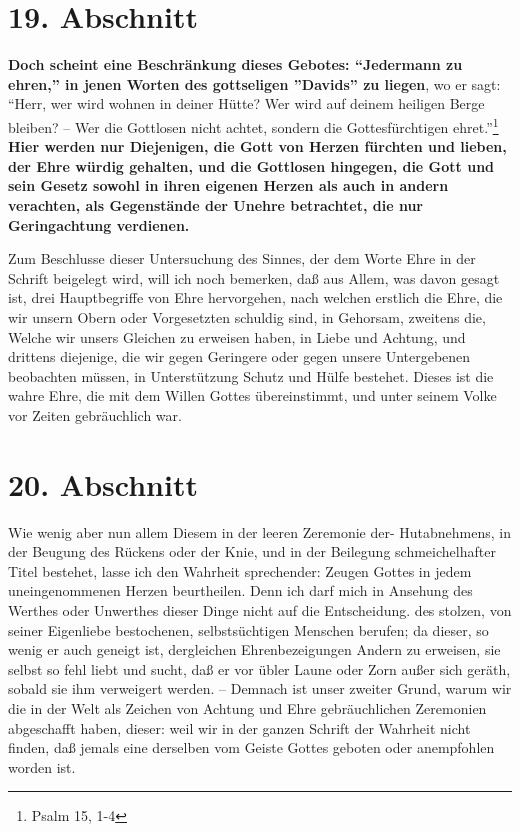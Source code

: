 \section{19. Abschnitt} \label{kap9_ab19}

\textbf{Doch scheint eine Beschränkung dieses Gebotes: "`Jedermann zu ehren,"' in jenen
Worten des gottseligen ''Davids'' zu liegen}, wo er sagt: "`Herr, wer wird wohnen
in deiner Hütte? Wer wird auf deinem heiligen Berge bleiben? -- Wer die
Gottlosen nicht achtet, sondern die Gottesfürchtigen ehret."'\footnote{Psalm 15,
1-4} \textbf{Hier werden nur Diejenigen, die Gott von Herzen fürchten und lieben, der
Ehre würdig gehalten, und die Gottlosen hingegen, die Gott und sein Gesetz
sowohl in ihren eigenen Herzen als auch in andern verachten, als Gegenstände der
Unehre betrachtet, die nur Geringachtung verdienen.}

Zum Beschlusse dieser Untersuchung des Sinnes, der dem Worte Ehre in der Schrift
beigelegt wird, will ich noch bemerken, daß aus Allem, was davon gesagt ist,
drei Hauptbegriffe von Ehre hervorgehen, nach welchen erstlich die Ehre, die wir
unsern Obern oder Vorgesetzten schuldig sind, in Gehorsam, zweitens die, Welche
wir unsers Gleichen zu erweisen haben, in Liebe und Achtung, und drittens
diejenige, die wir gegen Geringere oder gegen unsere Untergebenen beobachten
müssen, in Unterstützung Schutz und Hülfe bestehet. Dieses ist die wahre Ehre,
die mit dem Willen Gottes übereinstimmt, und unter seinem Volke vor Zeiten
gebräuchlich war.

\section{20. Abschnitt} \label{kap9_ab20}

Wie wenig aber nun allem Diesem in der leeren Zeremonie der- Hutabnehmens, in
der Beugung des Rückens oder der Knie, und in der Beilegung schmeichelhafter
Titel bestehet, lasse ich den Wahrheit sprechender: Zeugen Gottes in jedem
uneingenommenen Herzen beurtheilen. Denn ich darf mich in Ansehung des Werthes
oder Unwerthes dieser Dinge nicht auf die Entscheidung. des stolzen, von seiner
Eigenliebe bestochenen, selbstsüchtigen Menschen berufen; da dieser, so wenig er
auch geneigt ist, dergleichen Ehrenbezeigungen Andern zu erweisen, sie selbst so
fehl liebt und sucht, daß er vor übler Laune oder Zorn außer sich geräth, sobald
sie ihm verweigert werden. -- Demnach ist unser zweiter Grund, warum wir die in
der Welt als Zeichen von Achtung und Ehre gebräuchlichen Zeremonien abgeschafft
haben, dieser: weil wir in der ganzen Schrift der Wahrheit nicht finden, daß
jemals eine derselben vom Geiste Gottes geboten oder anempfohlen worden ist.

